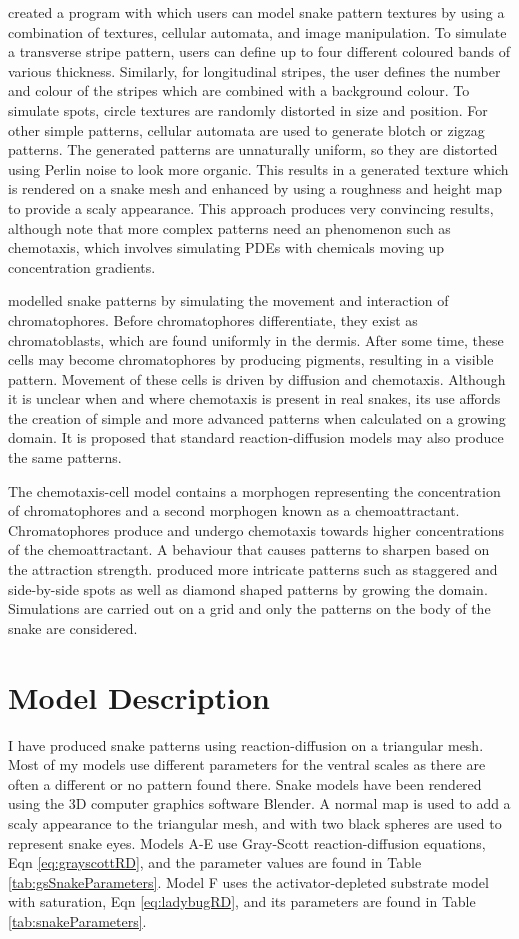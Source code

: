 \citet{pinheiro2017} created a program with which users can model snake pattern textures by using a combination of textures, cellular automata, and image manipulation. To simulate a transverse stripe pattern, users can define up to four different coloured bands of various thickness. Similarly, for longitudinal stripes, the user defines the number and colour of the stripes which are combined with a background colour. To simulate spots, circle textures are randomly distorted in size and position. For other simple patterns, cellular automata are used to generate blotch or zigzag patterns. The generated patterns are unnaturally uniform, so they are distorted using Perlin noise to look more organic. This results in a generated texture which is rendered on a snake mesh and enhanced by using a roughness and height map to provide a scaly appearance. This approach produces very convincing results, although \citet{pinheiro2017} note that more complex patterns need an phenomenon such as chemotaxis, which involves simulating PDEs with chemicals moving up concentration gradients.

\citet{MURRAY1991} modelled snake patterns by simulating the movement and interaction of chromatophores. Before chromatophores differentiate, they exist as chromatoblasts, which are found uniformly in the dermis. After some time, these cells may become chromatophores by producing pigments, resulting in a visible pattern. Movement of these cells is driven by diffusion and chemotaxis. Although it is unclear when and where chemotaxis is present in real snakes, its use affords the creation of simple and more advanced patterns when calculated on a growing domain. It is proposed that standard reaction-diffusion models may also produce the same patterns.

The chemotaxis-cell model contains a morphogen representing the concentration of chromatophores and a second morphogen known as a chemoattractant. Chromatophores produce and undergo chemotaxis towards higher concentrations of the chemoattractant. A behaviour that causes patterns to sharpen based on the attraction strength. \citet{MURRAY1991} produced more intricate patterns such as staggered and side-by-side spots as well as diamond shaped patterns by growing the domain. Simulations are carried out on a grid and only the patterns on the body of the snake are considered.

\section{Model Description}
I have produced snake patterns using reaction-diffusion on a triangular mesh. Most of my models use different parameters for the ventral scales as there are often a different or no pattern found there. Snake models have been rendered using the 3D computer graphics software Blender. A normal map is used to add a scaly appearance to the triangular mesh, and with two black spheres are used to represent snake eyes. Models A-E use Gray-Scott reaction-diffusion equations, Eqn \ref{eq:grayscottRD}, and the parameter values are found in Table \ref{tab:gsSnakeParameters}. Model F uses the activator-depleted substrate model with saturation, Eqn \ref{eq:ladybugRD}, and its parameters are found in Table \ref{tab:snakeParameters}.

